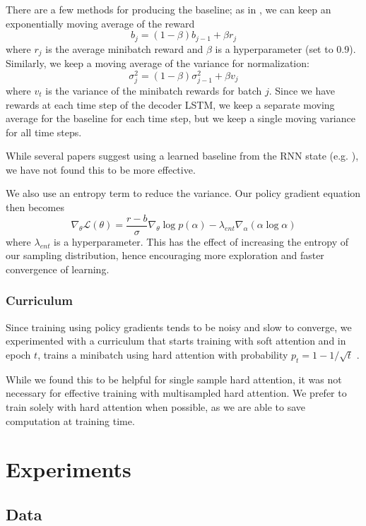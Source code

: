 \documentclass[11pt]{report}
\begin{document}
There are a few methods for producing the baseline; as in \cite{mnih2014belief}, we can keep an exponentially moving average of the reward
$$b_j = (1 - \beta) b_{j-1} + \beta r_j$$
where $r_j$ is the average minibatch reward and $\beta$ is a hyperparameter (set to 0.9).
Similarly, we keep a moving average of the variance for normalization:
$$\sigma^2_j = (1 - \beta) \sigma^2_{j-1} + \beta v_j$$
where $v_t$ is the variance of the minibatch rewards for batch $j$. Since we have rewards at each time step of the decoder LSTM, we keep a separate moving average for the baseline for each time step, but we keep a single moving variance for all time steps.

While several papers suggest using a learned baseline from the RNN state (e.g. \cite{ranzato2015}), we have not found this to be more effective.

We also use an entropy term to reduce the variance. Our policy gradient equation then becomes
\begin{equation}
\label{policygradbaselineentropy}
\nabla_\theta \mathcal{L}(\theta) = \frac{r-b}{\sigma} \nabla_\theta \log p(\alpha) - \lambda_{ent} \nabla_\alpha(\alpha \log \alpha)
\end{equation}
where $\lambda_{ent}$ is a hyperparameter. This has the effect of increasing the entropy of our sampling distribution, hence encouraging more exploration and faster convergence of learning.

\subsection{Curriculum}

Since training using policy gradients tends to be noisy and slow to converge, we experimented with a curriculum that starts training with soft attention and in epoch $t$, trains a minibatch using hard attention with probability $p_t = 1 - 1/\sqrt{t}$ \citep{bengio2016hardntm}.

While we found this to be helpful for single sample hard attention, it was not necessary for effective training with multisampled hard attention. We prefer to train solely with hard attention when possible, as we are able to save computation at training time.


\chapter{Experiments}

\section{Data}
\end{document}
